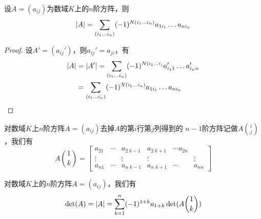 \documentclass[11pt]{article}
\begin{document}
\begin{corollary}[]
设\(A=(a_{ij})\)为数域\(K\)上的\(n\)阶方阵，则
\begin{equation*}
\abs{A}=\sum_{(i_1\dots i_n)}(-1)^{N(i_1\dots i_n)}a_{1i_1}\dots a_{ni_n}
\end{equation*}
\end{corollary}

\begin{proof}
设\(A'=(a_{ij}')\)，则\(a_{ij}'=a_{ji}\)，有
\begin{align*}
\abs{A}&=\abs{A'}=\sum_{(i_1\dots i_n)}(-1)^{N(i_1\dots i_)}a_{i_11}'\dots a_{i_nn}'\\
&=\sum_{(i_1\dots i_n)}(-1)^{N(i_1\dots i_n)}a_{1i_1}\dots a_{ni_n}
\end{align*}
\end{proof}

对数域\(K\)上\(n\)阶方阵\(A=(a_{ij})\)去掉\(A\)的第\(i\)行第\(j\)列得到的
\(n-1\)阶方阵记做\(A\binom{i}{j}\)，我们有
\begin{equation*}
A\binom{1}{k}=
\begin{bmatrix}
a_{21}&\cdots&a_{2\;k-1}&a_{2\;k+1}&\cdots a_{2n}\\
\vdots&&\vdots&\vdots&&\vdots\\
a_{n1}&\cdots&a_{n\; k-1}&a_{n\;k+1}&\cdots&a_{nn}
\end{bmatrix}
\end{equation*}

\begin{theorem}[]
对数域\(K\)上的\(n\)阶方阵\(A=(a_{ij})\)，我们有
\begin{equation*}
\det(A)=\abs{A}=
\sum_{k=1}^n(-1)^{1+k}a_{1+k}\det(A\binom{1}{k})
\end{equation*}
\end{theorem}
\end{document}
